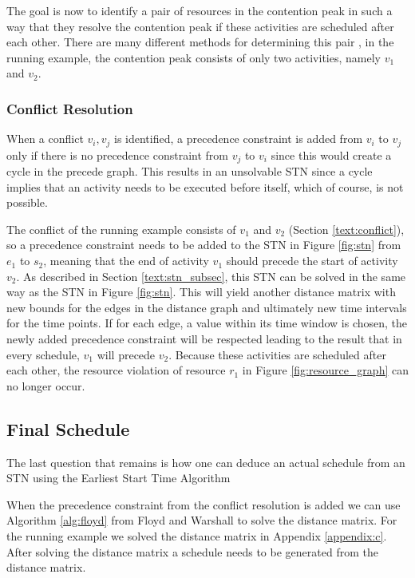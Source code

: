 \documentclass{article}
\theoremstyle{definition}
\begin{document}
The goal is now to identify a pair of resources in the contention peak in such a way that they resolve the contention peak if these activities are scheduled after each other. There are many different methods for determining this pair \cite{lombardi10}, in the running example, the contention peak consists of only two activities, namely $v_1$ and $v_2$.

\subsubsection{Conflict Resolution}
When a conflict ${v_i, v_j}$ is identified, a precedence constraint is added from $v_i$ to $v_j$ only if there is no precedence constraint from $v_j$ to $v_i$ since this would create a cycle in the precede graph. This results in an unsolvable STN since a cycle implies that an activity needs to be executed before itself, which of course, is not possible.

The conflict of the running example consists of $v_1$ and $v_2$ (Section \ref{text:conflict}), so a precedence constraint needs to be added to the STN in Figure \ref{fig:stn} from $e_1$ to $s_2$, meaning that the end of activity $v_1$ should precede the start of activity $v_2$. As described in Section \ref{text:stn_subsec}, this STN can be solved in the same way as the STN in Figure \ref{fig:stn}. This will yield another distance matrix with new bounds for the edges in the distance graph and ultimately new time intervals for the time points. If for each edge, a value within its time window is chosen, the newly added precedence constraint will be respected leading to the result that in every schedule, $v_1$ will precede $v_2$. Because these activities are scheduled after each other, the resource violation of resource $r_1$ in Figure \ref{fig:resource_graph} can no longer occur.

\subsection{Final Schedule}
The last question that remains is how one can deduce an actual schedule from an STN using the Earliest Start Time Algorithm


When the precedence constraint from the conflict resolution is added we can use Algorithm \ref{alg:floyd} from Floyd and Warshall to solve the distance matrix.
For the running example we solved the distance matrix in Appendix \ref{appendix:c}.
After solving the distance matrix a schedule needs to be generated from the distance matrix.
\end{document}
